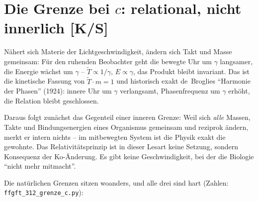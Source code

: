 \documentclass[11pt]{report}
\begin{document}
\section{Die Grenze bei $c$: relational, nicht innerlich [K/S]}

Nähert sich Materie der Lichtgeschwindigkeit, ändern sich Takt und
Masse gemeinsam: Für den ruhenden Beobachter geht die bewegte Uhr
um $\gamma$ langsamer, die Energie wächst um $\gamma$ --
$\tilde T \propto 1/\gamma$, $E \propto \gamma$, das Produkt bleibt
invariant. Das ist die kinetische Fassung von
$\tilde T \cdot m = 1$ und historisch exakt de~Broglies
\enquote{Harmonie der Phasen} (1924): innere Uhr um $\gamma$
verlangsamt, Phasenfrequenz um $\gamma$ erhöht, die Relation bleibt
geschlossen.

Daraus folgt zunächst das Gegenteil einer inneren Grenze: Weil sich
\emph{alle} Massen, Takte und Bindungsenergien eines Organismus
gemeinsam und reziprok ändern, merkt er intern nichts -- im
mitbewegten System ist die Physik exakt die gewohnte. Das
Relativitätsprinzip ist in dieser Lesart keine Setzung, sondern
Konsequenz der Ko-Änderung. Es gibt keine Geschwindigkeit, bei der
die Biologie \enquote{nicht mehr mitmacht}.

Die natürlichen Grenzen sitzen woanders, und alle drei sind hart
(Zahlen: \texttt{ffgft\_312\_grenze\_c.py}):
\end{document}
